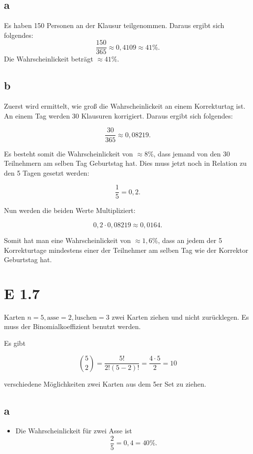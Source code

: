 \documentclass[12pt]{article}
\begin{document}
\subsection{a}
Es haben 150 Personen an der Klausur teilgenommen. Daraus ergibt sich folgendes:
\begin{equation}
\frac{150}{365} \approx 0,4109 \approx 41 \%.
\end{equation}
Die Wahrscheinlickeit beträgt $\approx 41\%$.

\subsection{b}
Zuerst wird ermittelt, wie groß die Wahrscheinlickeit an einem Korrekturtag ist. An einem Tag werden
30 Klausuren korrigiert. Daraus ergibt sich folgendes:

\begin{equation}
\frac{30}{365} \approx 0,08219. 
\end{equation}

Es besteht somit die Wahrscheinlickeit von $\approx 8\%$, dass jemand von den 30 Teilnehmern am
selben Tag Geburtstag hat. Dies muss jetzt noch in Relation zu den 5 Tagen gesetzt werden:

\begin{equation}
\frac{1}{5} = 0,2.
\end{equation}


Nun werden die beiden Werte Multipliziert:

\begin{equation}
0,2 \cdot 0,08219 \approx 0,0164.
\end{equation}

Somit hat man eine Wahrscheinlickeit von $\approx 1,6\%$, dass an jedem der 5 Korrekturtage mindestens
einer der Teilnehmer am selben Tag wie der Korrektor Geburtstag hat.

\section{E 1.7}
Karten $n=5, \text{asse}=2, \text{luschen}=3$ zwei Karten ziehen und nicht zurücklegen. Es muss der Binomialkoeffizient
benutzt werden.

Es gibt 

\begin{equation}
\binom{5}{2} = \frac{5!}{2!(5-2)!} = \frac{ 4 \cdot 5}{2} = 10
\end{equation}

verschiedene Möglichkeiten zwei Karten aus dem 5er Set zu ziehen.

\subsection{a}
\begin{itemize}
    \item Die Wahrscheinlickeit für zwei Asse ist
    \begin{equation}
    \frac{2}{5} = 0,4 = 40\%.
    \end{equation}

\end{itemize}
\end{document}
